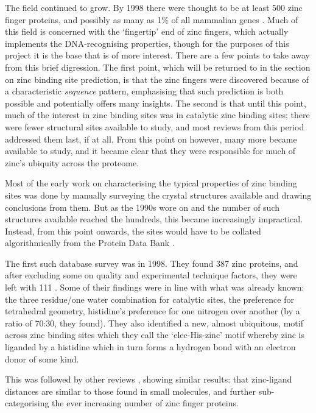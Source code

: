 The field continued to grow. By 1998 there were thought to be at least 500 zinc finger proteins, and possibly as many as 1\% of all mammalian genes \cite{mackay1998zinc}. Much of this field is concerned with the `fingertip' end of zinc fingers, which actually implements the DNA-recognising properties, though for the purposes of this project it is the base that is of more interest. There are a few points to take away from this brief digression. The first point, which will be returned to in the section on zinc binding site prediction, is that the zinc fingers were discovered because of a characteristic \textit{sequence} pattern, emphasising that such prediction is both possible and potentially offers many insights. The second is that until this point, much of the interest in zinc binding sites was in catalytic zinc binding sites; there were fewer structural sites available to study, and most reviews from this period addressed them last, if at all. From this point on however, many more became available to study, and it became clear that they were responsible for much of zinc's ubiquity across the proteome.

Most of the early work on characterising the typical properties of zinc binding sites was done by manually surveying the crystal structures available and drawing conclusions from them. But as the 1990s wore on and the number of such structures available reached the hundreds, this became increasingly impractical. Instead, from this point onwards, the sites would have to be collated algorithmically from the Protein Data Bank \cite{berman2000pdb}.

The first such database survey was in 1998. They found 387 zinc proteins, and after excluding some on quality and experimental technique factors, they were left with 111 \cite{alberts1998analysis}. Some of their findings were in line with what was already known: the three residue/one water combination for catalytic sites, the preference for tetrahedral geometry, histidine's preference for one nitrogen over another (by a ratio of 70:30, they found). They also identified a new, almost ubiquitous, motif across zinc binding sites which they call the `elec-His-zinc' motif whereby zinc is liganded by a histidine which in turn forms a hydrogen bond with an electron donor of some kind.

This was followed by other reviews \cite{roe1999zinc,laity2001zinc,grishin2001treble,harding2001geometry,krishna2003structural}, showing similar results: that zinc-ligand distances are similar to those found in small molecules, and further sub-categorising the ever increasing number of zinc finger proteins.

